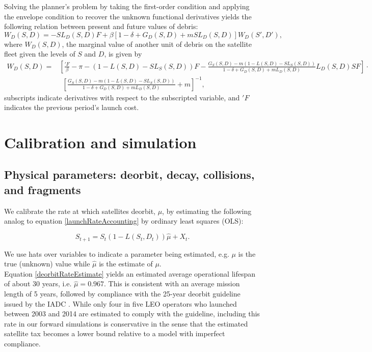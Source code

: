 \documentclass[12pt]{article}
\begin{document}
Solving the planner's problem by taking the first-order condition and applying the envelope condition to recover the unknown functional derivatives yields the following relation between present and future values of debris:
\begin{equation}
\label{plannersFOC}
W_D(S,D) = - S L_D(S,D) F + \beta [1 - \delta + G_D(S,D) + m SL_D(S,D)] W_D(S',D'),
\end{equation}
where $W_D(S,D)$, the marginal value of another unit of debris on the satellite fleet given the levels of $S$ and $D$, is given by
\begin{align}
\label{W_Dformula}
W_D(S,D) =& \left[ \frac{'F}{\beta} - \pi - (1 - L(S,D) - S L_S(S,D))F - \frac{G_S(S,D) - m(1 - L(S,D) - SL_S(S,D))}{1 - \delta + G_D(S,D) + m L_D(S,D)}L_D(S,D) S F  \right] \cdot \nonumber \\
& ~~ \left[ \frac{G_S(S,D) - m(1 - L(S,D) - SL_S(S,D))}{1 - \delta + G_D(S,D) + m L_D(S,D)} + m \right]^{-1},
\end{align}
subscripts indicate derivatives with respect to the subscripted variable, and $'F$ indicates the previous period's launch cost.

\section{Calibration and simulation}

\subsection{Physical parameters: deorbit, decay, collisions, and fragments}

We calibrate the rate at which satellites deorbit, $\mu$, by estimating the following analog to equation \ref{launchRateAccounting} by ordinary least squares (OLS):

\begin{equation}
\label{deorbitRateEstimate}
S_{t+1} = S_t(1-L(S_t,D_t))\hat{\mu} + X_t.
\end{equation}

We use hats over variables to indicate a parameter being estimated, e.g. $\mu$ is the true (unknown) value while $\hat{\mu}$ is the estimate of $\mu$. \\

Equation \ref{deorbitRateEstimate} yields an estimated average operational lifespan of about 30 years, i.e. $\hat{\mu} = 0.967$. This is consistent with an average mission length of 5 years, followed by compliance with the 25-year deorbit guideline issued by the IADC \citep{IADCdmg}. While only four in five LEO operators who launched between 2003 and 2014 are estimated to comply with the guideline, including this rate in our forward simulations is conservative in the sense that the estimated satellite tax becomes a lower bound relative to a model with imperfect compliance. \\
\end{document}
